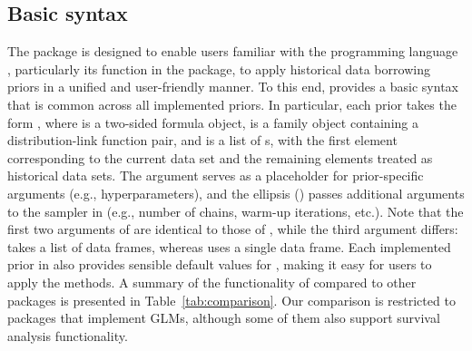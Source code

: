 \subsection{Basic syntax}
The  package is designed to enable users familiar with the  programming language \citep{rlanguage}, particularly its  function in the  package, to apply historical data borrowing priors in a unified and user-friendly manner. To this end,  provides a basic syntax that is common across all implemented priors. In particular, each prior takes the form , where  is a  two-sided formula  object,  is a family object containing a distribution-link function pair, and  is a list of s, with the first element corresponding to the current data set and the remaining elements treated as historical data sets. The argument  serves as a placeholder for prior-specific arguments (e.g., hyperparameters), and the ellipsis () passes additional arguments to the sampler in  (e.g., number of chains, warm-up iterations, etc.). Note that the first two arguments of  are identical to those of , while the third argument differs:  takes a list of data frames, whereas  uses a single data frame. Each implemented prior in  also provides sensible default values for , making it easy for users to apply the methods. A summary of the functionality of  compared to other packages is presented in Table~\ref{tab:comparison}. Our comparison is restricted to packages that implement GLMs, although some of them also support survival analysis functionality.

